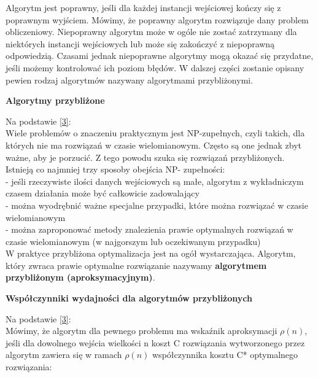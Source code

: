 \documentclass[a4paper, twoside, 12pt, justified]{article}
\begin{document}
	Algorytm jest poprawny, jeśli dla każdej instancji wejściowej kończy się z poprawnym wyjściem. Mówimy, że poprawny algorytm rozwiązuje dany problem obliczeniowy. Niepoprawny algorytm może w ogóle nie zostać zatrzymany dla niektórych instancji wejściowych lub	może się zakończyć z niepoprawną odpowiedzią. Czasami jednak niepoprawne algorytmy
	mogą okazać się przydatne, jeśli możemy kontrolować ich poziom błędów. W dalszej części zostanie opisany pewien rodzaj algorytmów nazywany algorytmami przybliżonymi.\\
	
	
	\begin{large}
		\begin{center}
			\textbf{Algorytmy przybliżone}
		\end{center}
	\end{large}

	Na podstawie \hyperlink{algorithm}{[3]}:\\
	Wiele problemów o znaczeniu praktycznym jest NP-zupełnych, czyli takich, dla których nie ma rozwiązań w czasie wielomianowym. Często są one jednak zbyt ważne, aby je porzucić. Z tego powodu szuka się rozwiązań przybliżonych. Istnieją co najmniej trzy sposoby obejścia NP- zupełności:\\
	- jeśli rzeczywiste ilości danych wejściowych są małe,
	algorytm z wykładniczym czasem działania może być całkowicie zadowalający\\
	- można wyodrębnić ważne specjalne przypadki, które można rozwiązać w czasie wielomianowym\\
	- można zaproponować metody znalezienia prawie optymalnych rozwiązań w czasie wielomianowym (w najgorszym lub oczekiwanym przypadku)\\
	
	W praktyce przybliżona optymalizacja jest na ogół wystarczająca. Algorytm, który zwraca prawie optymalne
	rozwiązanie nazywamy \textbf{algorytmem przybliżonym (aproksymacyjnym)}.\\
	
	\begin{large}
		\begin{center}
			\textbf{Współczynniki wydajności dla algorytmów przybliżonych}
		\end{center}
	\end{large}
	
	Na podstawie \hyperlink{algorithm}{[3]}:\\
	
	Mówimy, że algorytm dla pewnego problemu ma wskaźnik aproksymacji $\rho(n)$, jeśli dla dowolnego wejścia wielkości n koszt C rozwiązania wytworzonego przez algorytm zawiera się
	w ramach $\rho(n)$ współczynnika kosztu C* optymalnego rozwiązania:
	
\end{document}

